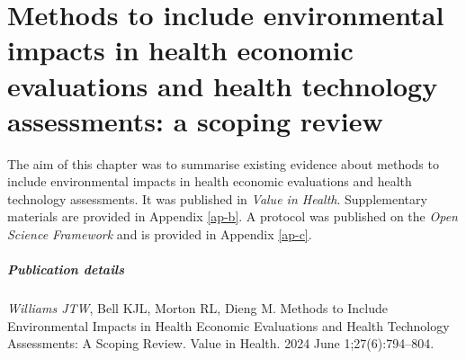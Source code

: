 \chapter{Methods to include environmental impacts in health economic evaluations and health technology assessments: a scoping review}
\label{ch-4}

The aim of this chapter was to summarise existing evidence about methods to include environmental impacts in health economic evaluations and health technology assessments. It was published in \textit{Value in Health}. Supplementary materials are provided in Appendix \ref{ap-b}. A protocol was published on the \textit{Open Science Framework} and is provided in Appendix \ref{ap-c}.

\paragraph*{Publication details}
\textit{Williams JTW}, Bell KJL, Morton RL, Dieng M. Methods to Include Environmental Impacts in Health Economic Evaluations and Health Technology Assessments: A Scoping Review. Value in Health. 2024 June 1;27(6):794–804. 
























